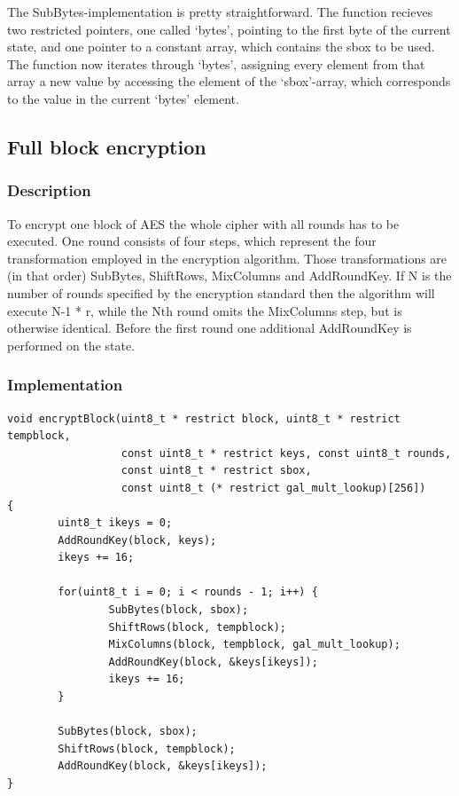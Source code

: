 The SubBytes-implementation is pretty straightforward. The function
recieves two restricted pointers, one called `bytes', pointing to the
first byte of the current state, and one pointer to a constant array,
which contains the sbox to be used. The function now iterates through
`bytes', assigning every element from that array a new value by
accessing the element of the `sbox'-array, which corresponds to the
value in the current `bytes' element.

\hypertarget{full-block-encryption}{%
\subsection{Full block encryption}\label{full-block-encryption}}

\hypertarget{description-6}{%
\subsubsection{Description}\label{description-6}}

To encrypt one block of AES the whole cipher with all rounds has to be
executed. One round consists of four steps, which represent the four
transformation employed in the encryption algorithm. Those transformations are (in that order) SubBytes, ShiftRows, MixColumns and AddRoundKey.
If N is the number of rounds specified by the encryption standard then
the algorithm will execute N-1 * r, while the Nth round omits the
MixColumns step, but is otherwise identical. Before the first round one
additional AddRoundKey is performed on the state.

\hypertarget{implementation-5}{%
\subsubsection{Implementation}\label{implementation-5}}

\begin{lstlisting}
void encryptBlock(uint8_t * restrict block, uint8_t * restrict tempblock, 
                  const uint8_t * restrict keys, const uint8_t rounds, 
                  const uint8_t * restrict sbox, 
                  const uint8_t (* restrict gal_mult_lookup)[256])
{   
        uint8_t ikeys = 0;
        AddRoundKey(block, keys);
        ikeys += 16;

        for(uint8_t i = 0; i < rounds - 1; i++) {   
                SubBytes(block, sbox);
                ShiftRows(block, tempblock);
                MixColumns(block, tempblock, gal_mult_lookup);
                AddRoundKey(block, &keys[ikeys]);
                ikeys += 16;
        }
        
        SubBytes(block, sbox);
        ShiftRows(block, tempblock);
        AddRoundKey(block, &keys[ikeys]);
}
\end{lstlisting}

